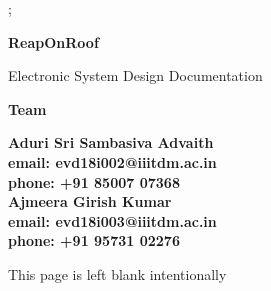 \documentclass[a4paper,10pt]{book}
\begin{document}
\begin{titlepage}
    ;
    \vspace{7cm}
    \begin{center}
        {
        \fontsize{50}{60}\selectfont \textbf{ReapOnRoof}
        }
    \end{center}
    \begin{center}
        {
        \centering
        \fontsize{30}{50}\selectfont Electronic System Design Documentation
        }
    \end{center}
    
    \vspace{50px}
    
    \begin{center}
        \fontsize{30}{40} \textbf{Team}
    \end{center}
    
    \begin{center}
        \begin{multicols}{2}
            {
                \textbf{
                \fontsize{11}{13}\selectfont
                Aduri Sri Sambasiva Advaith\\
                email: evd18i002@iiitdm.ac.in\\
                phone: +91 85007 07368 \\
                \columnbreak
                Ajmeera Girish Kumar\\
                email: evd18i003@iiitdm.ac.in\\
                phone: +91 95731 02276
                }
            }
        \end{multicols}

    \end{center}


    
    \vspace{25px}
\end{titlepage}
{
    
    \begin{center}
        \vspace*{\fill}
        This page is left blank intentionally
        \vspace*{\fill}
    \end{center}
}
\end{document}
